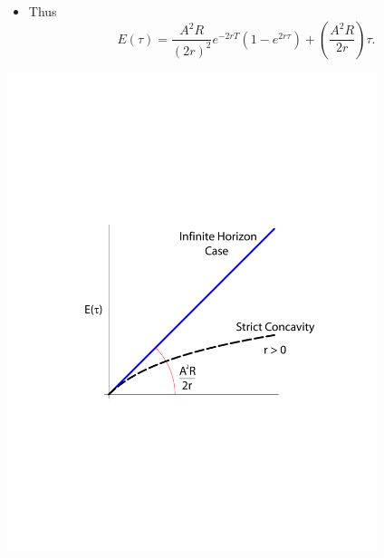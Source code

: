 \documentclass[12pt,compress,handout]{beamer}  %
\begin{document}
\begin{frame}
\begin{itemize}
\item Thus
\begin{equation}
E(\tau )=\dfrac{A^{2}R}{(2r)^{2}}e^{-2rT}(1-e^{2r\tau })+\left(
\dfrac{A^{2}R}{2r}\right) \tau \text{.}\label{eq:two}
\end{equation}
\end{itemize}
\end{frame}


\begin{frame}

\begin{center}
\includegraphics[width=4.25in]{include/fig-finite-horiz}
\end{center}

\end{frame}
\end{document}
